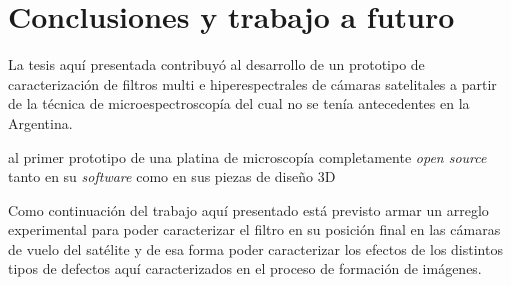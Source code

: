 \singlespacing
\chapter{Conclusiones y trabajo a futuro}
\label{chap:concls}

\hspace{0.5cm}La tesis aquí presentada contribuyó al desarrollo de un prototipo de caracterización de filtros multi e hiperespectrales de cámaras satelitales a partir de la técnica de microespectroscopía del cual no se tenía antecedentes en la Argentina.




 

al primer prototipo de una platina de microscopía completamente \textit{open source} tanto en su \textit{software} como en sus piezas de diseño 3D



Como continuación del trabajo aquí presentado está previsto armar un arreglo experimental para poder caracterizar el filtro en su posición final en las cámaras de vuelo del satélite y de esa forma poder caracterizar los efectos de los distintos tipos de defectos aquí caracterizados en el proceso de formación de imágenes.